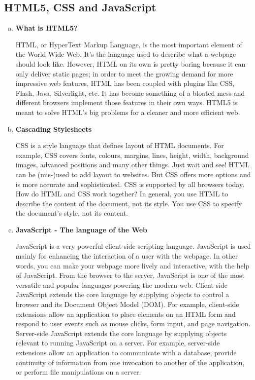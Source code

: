 \documentclass[paper.tex]{subfiles}
\begin{document}
\subsection{HTML5, CSS and JavaScript}
\begin{enumerate}[a.]
\item \textbf{What is HTML5?}
  \par
    HTML, or HyperText Markup Language, is the most important element of the World Wide Web. It’s the language used to describe what a webpage should look like. However, HTML on its own is pretty boring because it can only deliver static pages; in order to meet the growing demand for more impressive web features, HTML has been coupled with plugins like CSS, Flash, Java, Silverlight, etc.
    \break
    It has become something of a bloated mess and different browsers implement those features in their own ways. HTML5 is meant to solve HTML’s big problems for a cleaner and more efficient web.
\item \textbf{Cascading Stylesheets}
  \par
    CSS is a style language that defines layout of HTML documents. For example, CSS covers fonts, colours, margins, lines, height, width, background images, advanced positions and many other things. Just wait and see!
    HTML can be (mis-)used to add layout to websites. But CSS offers more options and is more accurate and sophisticated. CSS is supported by all browsers today.
    \newline
    \break
    How do HTML and CSS work together? In general, you use HTML to describe the content of the document, not its style. You use CSS to specify the document's style, not its content.
\item \textbf{JavaScript - The language of the Web}
  \par
    JavaScript is a very powerful client-side scripting language. JavaScript is used mainly for enhancing the interaction of a user with the webpage. In other words, you can make your webpage more lively and interactive, with the help of JavaScript.
    From the browser to the server, JavaScript is one of the most versatile and popular languages powering the modern web.
    \newline
    \break
    Client-side JavaScript extends the core language by supplying objects to control a browser and its Document Object Model (DOM). For example, client-side extensions allow an application to place elements on an HTML form and respond to user events such as mouse clicks, form input, and page navigation.
    \newline
    \break
    Server-side JavaScript extends the core language by supplying objects relevant to running JavaScript on a server. For example, server-side extensions allow an application to communicate with a database, provide continuity of information from one invocation to another of the application, or perform file manipulations on a server.
\end{enumerate}
\end{document}

